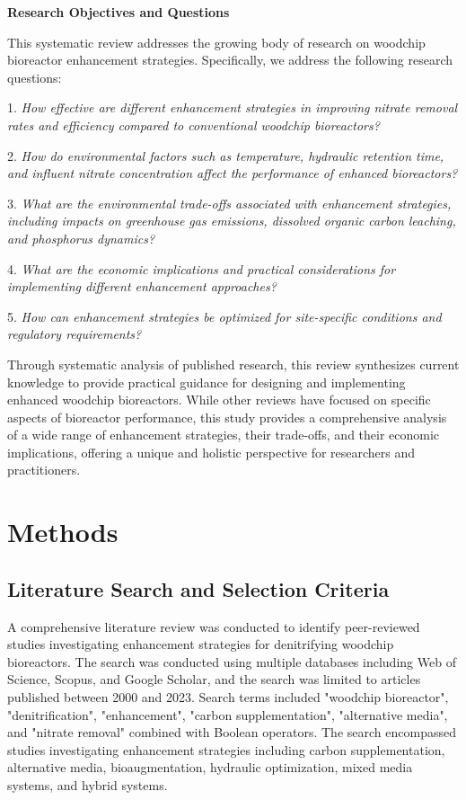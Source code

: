 \documentclass[12pt,a4paper]{article}
\begin{document}
\textbf{Research Objectives and Questions}

This systematic review addresses the growing body of research on woodchip bioreactor enhancement strategies. Specifically, we address the following research questions:

1. \textit{How effective are different enhancement strategies in improving nitrate removal rates and efficiency compared to conventional woodchip bioreactors?}

2. \textit{How do environmental factors such as temperature, hydraulic retention time, and influent nitrate concentration affect the performance of enhanced bioreactors?}

3. \textit{What are the environmental trade-offs associated with enhancement strategies, including impacts on greenhouse gas emissions, dissolved organic carbon leaching, and phosphorus dynamics?}

4. \textit{What are the economic implications and practical considerations for implementing different enhancement approaches?}

5. \textit{How can enhancement strategies be optimized for site-specific conditions and regulatory requirements?}

Through systematic analysis of published research, this review synthesizes current knowledge to provide practical guidance for designing and implementing enhanced woodchip bioreactors. While other reviews have focused on specific aspects of bioreactor performance, this study provides a comprehensive analysis of a wide range of enhancement strategies, their trade-offs, and their economic implications, offering a unique and holistic perspective for researchers and practitioners.

\section{Methods}

\subsection{Literature Search and Selection Criteria}

A comprehensive literature review was conducted to identify peer-reviewed studies investigating enhancement strategies for denitrifying woodchip bioreactors. The search was conducted using multiple databases including Web of Science, Scopus, and Google Scholar, and the search was limited to articles published between 2000 and 2023. Search terms included "woodchip bioreactor", "denitrification", "enhancement", "carbon supplementation", "alternative media", and "nitrate removal" combined with Boolean operators. The search encompassed studies investigating enhancement strategies including carbon supplementation, alternative media, bioaugmentation, hydraulic optimization, mixed media systems, and hybrid systems.
\end{document}
